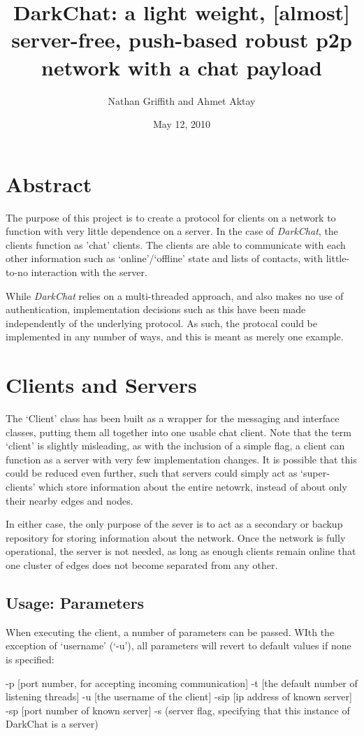 \documentclass[11pt]{article}
\title{DarkChat: a light weight, [almost] server-free, push-based robust p2p network with a chat payload}
\author{Nathan Griffith and Ahmet Aktay}
\date{May 12, 2010}
\begin{document}
\maketitle %

\section{Abstract}

The purpose of this project is to create a protocol for clients on a network to function with very little dependence on a server. In the case of \emph{DarkChat}, the clients function as 'chat' clients. The clients are able to communicate with each other information such as `online'/`offline' state and lists of contacts, with little-to-no interaction with the server.

While \emph{DarkChat} relies on a multi-threaded approach, and also makes no use of authentication, implementation decisions such as this have been made independently of the underlying protocol. As such, the protocal could be implemented in any number of ways, and this is meant as merely one example.

\section{Clients and Servers}
The `Client' class has been built as a wrapper for the messaging and interface classes, putting them all together into one usable chat client. Note that the term `client' is slightly misleading, as with the inclusion of a simple flag, a client can function as a server with very few implementation changes. It is possible that this could be reduced even further, such that servers could simply act as `super-clients' which store information about the entire netowrk, instead of about only their nearby edges and nodes. 

In either case, the only purpose of the sever is to act as a secondary or backup repository for storing information about the network. Once the network is fully operational, the server is not needed, as long as enough clients remain online that one cluster of edges does not become separated from any other.

\subsection{Usage: Parameters}
When executing the client, a number of parameters can be passed. WIth the exception of `username' (`-u'), all parameters will revert to default values if none is specified:
\begin{code}
-p [port number, for accepting incoming communication]
-t [the default number of listening threads]
-u [the username of the client]
-sip [ip address of known server]
-sp [port number of known server]
-s (server flag, specifying that this instance of DarkChat is a server)
\end{code}
\end{document}
